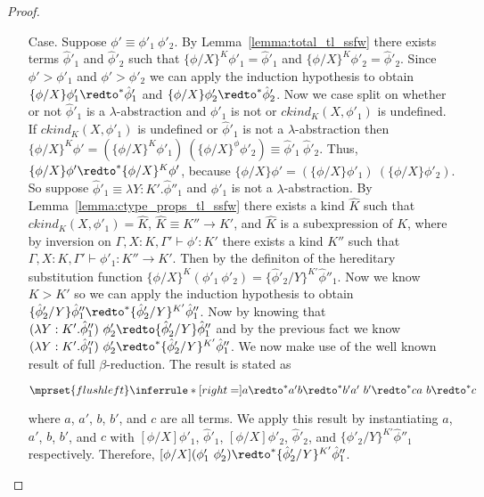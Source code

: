 \begin{proof}
\begin{itemize}
  \item[Case.] Suppose $\phi' \equiv \phi'_1\ \phi'_2$.  By
    Lemma~\ref{lemma:total_tl_ssfw} there exists terms $\hat{\phi}'_1$ and
    $\hat{\phi}'_2$ such that $\{\phi/X\}^K \phi'_1 = \hat{\phi}'_1$ and
    $\{\phi/X\}^K \phi'_2 = \hat{\phi}'_2$.  Since $\phi' > \phi'_1$ and $\phi' > \phi'_2$
    we can apply the induction hypothesis to obtain $\{\phi/X\}\phi'_1 \redto^*
    \hat{\phi}'_1$ and $\{\phi/X\}\phi'_2 \redto^* \hat{\phi}'_2$.  Now we case split
    on whether or not $\hat{\phi}'_1$ is a $\lambda$-abstraction and $\phi'_1$
    is not or $ckind_K(X,\phi'_1)$ is undefined.  If
    $ckind_K(X,\phi'_1)$ is undefined or $\hat{\phi}'_1$ is not a
    $\lambda$-abstraction then $\{\phi/X\}^K \phi' =
    (\{\phi/X\}^K \phi'_1)\ (\{\phi/X\}^\phi \phi'_2) \equiv
    \hat{\phi}'_1\ \hat{\phi}'_2$. Thus, $\{\phi/X\}\phi' \redto^* \{\phi/X\}^K \phi'$,
    because $\{\phi/X\}\phi' = (\{\phi/X\} \phi'_1)\ (\{\phi/X\} \phi'_2)$.  So suppose
    $\hat{\phi}'_1 \equiv \lambda Y:K'.\hat{\phi}''_1$ and $\phi'_1$ is not a
    $\lambda$-abstraction.  By Lemma~\ref{lemma:ctype_props_tl_ssfw} there
    exists a kind $\hat{K}$ such that $ckind_K(X,\phi'_1) = \hat{K}$, $\hat{K}
    \equiv K'' \to K'$, and $\hat{K}$ is a subexpression of $K$,
    where by inversion on $\Gamma,X:K,\Gamma' \vdash \phi':K'$ there
    exists a kind $K''$ such that $\Gamma,X:K,\Gamma' \vdash
    \phi'_1:K'' \to K'$.  Then by the definiton of the hereditary
    substitution function $\{\phi/X\}^K (\phi'_1\ \phi'_2) =
    \{\hat{\phi}'_2/Y\}^{K'} \hat{\phi}''_1$.  Now we know $K
    > K'$ so we can apply the induction hypothesis
    to obtain $\{\hat{\phi}'_2/Y\} \hat{\phi}''_1 \redto^*
    \{\hat{\phi}'_2/Y\}^{K'} \hat{\phi}''_1$.  Now by knowing that $(\lambda
    Y:K'.\hat{\phi}''_1)\ \phi'_2 \redto \{\hat{\phi}'_2/Y\} \hat{\phi}''_1$ and by
    the previous fact we know $(\lambda Y:K'.\hat{\phi}''_1)\ \phi'_2
    \redto^* \{\hat{\phi}'_2/Y\}^{K'} \hat{\phi}''_1$.  We now make use of
    the well known result of full $\beta$-reduction.  The result is
    stated as
    \begin{center}
      \begin{math}
        $$\mprset{flushleft}
        \inferrule* [right=] {
          a \redto^* a'
          \\\\
          b \redto^* b'
          \\
          a'\ b' \redto^* c
        }{a\ b \redto^* c}
      \end{math}
    \end{center}
    where $a$, $a'$, $b$, $b'$, and $c$ are all terms.  We apply this
    result by instantiating $a$, $a'$, $b$, $b'$, and $c$ with
    $[\phi/X] \phi'_1$, $\hat{\phi}'_1$, $[\phi/X] \phi'_2$, $\hat{\phi}'_2$, and $\{\hat{\phi}'_2/Y\}^{K'} \hat{\phi}''_1$ 
    respectively.  Therefore, $[\phi/X](\phi'_1\ \phi'_2) \redto^* \{\hat{\phi}'_2/Y\}^{K'} \hat{\phi}''_1$.    
  \end{itemize}
\end{proof}

